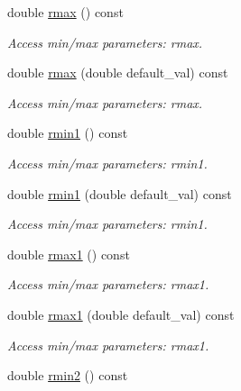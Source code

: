 \begin{DoxyCompactItemize}
double \hyperlink{struct_d_d4hep_1_1_x_m_l_1_1_dimension_a5a6284320015a5130fca031a0aefa151}{rmax} () const 
\begin{DoxyCompactList}\small\item\em Access min/max parameters: rmax. \item\end{DoxyCompactList}\item 
double \hyperlink{struct_d_d4hep_1_1_x_m_l_1_1_dimension_add4bf2b10c0350f5f509e4d29ac26a43}{rmax} (double default\_\-val) const 
\begin{DoxyCompactList}\small\item\em Access min/max parameters: rmax. \item\end{DoxyCompactList}\item 
double \hyperlink{struct_d_d4hep_1_1_x_m_l_1_1_dimension_a0d8fdeaa3fbd61665dccff7a36f35456}{rmin1} () const 
\begin{DoxyCompactList}\small\item\em Access min/max parameters: rmin1. \item\end{DoxyCompactList}\item 
double \hyperlink{struct_d_d4hep_1_1_x_m_l_1_1_dimension_abe93027899e16e048cc8dc5a6358e039}{rmin1} (double default\_\-val) const 
\begin{DoxyCompactList}\small\item\em Access min/max parameters: rmin1. \item\end{DoxyCompactList}\item 
double \hyperlink{struct_d_d4hep_1_1_x_m_l_1_1_dimension_a560c32c64f0272b16e5cba8868c8f69f}{rmax1} () const 
\begin{DoxyCompactList}\small\item\em Access min/max parameters: rmax1. \item\end{DoxyCompactList}\item 
double \hyperlink{struct_d_d4hep_1_1_x_m_l_1_1_dimension_a48e1b64f6d48a65460ef65ff298f949a}{rmax1} (double default\_\-val) const 
\begin{DoxyCompactList}\small\item\em Access min/max parameters: rmax1. \item\end{DoxyCompactList}\item 
double \hyperlink{struct_d_d4hep_1_1_x_m_l_1_1_dimension_ab51c4e3f885463ab6290492752f7d99a}{rmin2} () const 

\end{DoxyCompactItemize}
